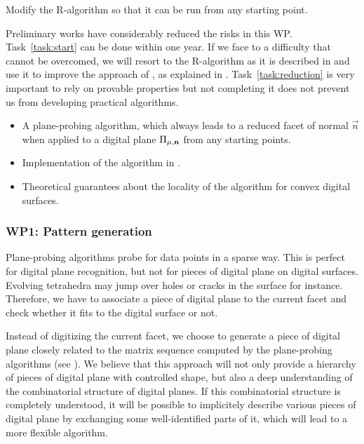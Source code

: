 \begin{Task}
  \label{task:start}
  Modify the R-algorithm so that it can be run from any starting point. 
\end{Task}


\Risks
Preliminary works have considerably reduced the risks in this WP. Task~\ref{task:start}
can be done within one year. If we face to a difficulty that cannot be overcomed,
we will resort to the R-algorithm as it is described in \cite{LPRJMIV2017} and use it
to improve the approach of \citeauthor*{Charrier2011} \cite{Charrier2011}, as explained
in . Task~\ref{task:reduction} is very important to rely on provable
properties but not completing it does not prevent us from developing practical algorithms.

\Success
\begin{itemize}
    \item A plane-probing algorithm, which always leads to a
      reduced facet of normal $\vec{n}$ when applied to a digital
      plane $\Pi_{\mu,\mathbf{n}}$ from any starting points.
    \item Implementation of the algorithm in \DGtal.   
    \item Theoretical guarantees about the locality of the algorithm
      for convex digital surfaces.  
\end{itemize}

  
\subsubsection{WP1: Pattern generation}
\label{wpPattern}


Plane-probing algorithms probe for data points in a sparse way.
This is perfect for digital plane recognition, but not for pieces
of digital plane on digital surfaces. Evolving tetrahedra may jump
over holes or cracks in the surface for instance. Therefore,
we have to associate a piece of digital plane
to the current facet and check whether it fits to the digital surface
or not.

Instead of digitizing the current facet, we choose to generate a piece
of digital plane closely related to the matrix sequence computed by
the plane-probing algorithms (see ). We believe that
this approach will not only provide a hierarchy of pieces of digital
plane with controlled shape, but also a deep understanding of the
combinatorial structure of digital planes. If this combinatorial
structure is completely understood, it will be possible to implicitely
describe various pieces of digital plane by exchanging some well-identified
parts of it, which will lead to a more flexible algorithm. 

